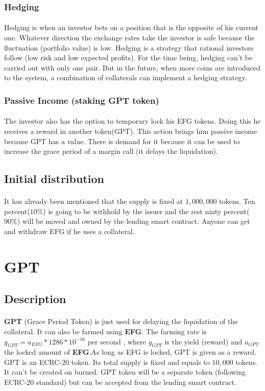 \documentclass{article}
\begin{document}
\subsubsection{Hedging}
\paragraph{ }
Hedging is when an investor bets on a position that is the opposite of his current one. Whatever direction the exchange rates take the investor is safe because the fluctuation (portfolio value) is low. Hedging is a strategy that rational investors follow (low risk and low expected profits). For the time being, hedging can't be carried out with only one pair. But in the future, when more coins are introduced to the system, a combination of collaterals can implement a hedging strategy.
\subsubsection{Passive Income (staking GPT token)}
\paragraph{ }
The investor also has the option to temporary lock his EFG tokens. Doing this he receives a reward in another token(GPT). This action brings him passive income because GPT has a value. There is demand for it because it can be used to increase the grace period of a margin call (it delays the liquidation).
\subsection{Initial distribution}
\paragraph{ }
It has already been mentioned that the supply is fixed at $1,000,000$ tokens. Ten percent($10\%$) is going to be withhold by the issuer and the rest ninty percent($90\%$) will be moved and owned by the lending smart contract. Anyone can get and withdraw EFG if he uses a collateral. 

\section{GPT}
\subsection{Description}
\paragraph{ }
\textbf{GPT} (Grace Period Token) is just used for delaying the liquidation of the collateral. It can also be farmed using \textbf{EFG}. The farming rate is $y_{GPT}=a_{EFG}*1286*10^{-16}$ per second , where $y_{GPT}$ is the yield (reward) and $a_{GPT}$ the locked amount of \textbf{EFG}.As long as EFG is locked, GPT is given as a reward. GPT is an ECRC-20 token. Its total supply is fixed and equals to $10,000$ tokens. It can't be created on burned. GPT token will be a separate token (following ECRC-20 standard) but can be accepted from the lending smart contract.
\end{document}
